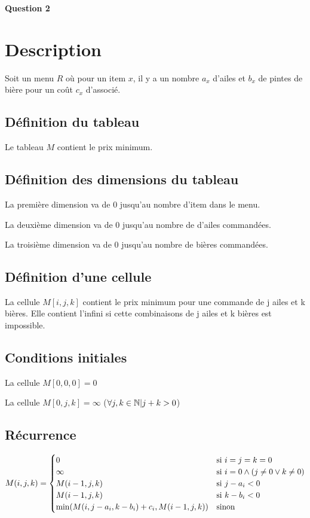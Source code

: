 \documentclass[class=article]{standalone}
\begin{document}
\centerline{\Huge \bf Question 2}
\bigskip

\section*{Description}

Soit un menu $R$ où pour un item $x$, il y a un nombre $a_x$ d'ailes 
et $b_x$ de pintes de bière pour un coût $c_x$ d'associé.

\subsection*{Définition du tableau}

Le tableau $M$ contient le prix minimum.

\subsection*{Définition des dimensions du tableau}

La première dimension va de 0 jusqu'au nombre d'item dans le menu.

La deuxième dimension va de 0 jusqu'au nombre de d'ailes commandées.

La troisième dimension va de 0 jusqu'au nombre de bières commandées.

\subsection*{Définition d'une cellule}

La cellule $M[i,j,k]$ contient le prix minimum pour une commande de j ailes et k bières.
Elle contient l'infini si cette combinaisons de j ailes et k bières est impossible.


\subsection*{Conditions initiales}

La cellule $M[0, 0, 0] = 0$

La cellule $M[0, j, k] = \infty$ ($\forall j, k \in \mathbb{N} | j + k > 0$)

\subsection*{Récurrence}

\[
    M(i, j, k) =
    \begin{cases}
        0 & \text{si } i=j=k=0 \\
        \infty & \text{si } i=0\wedge \left ( j \neq 0 \vee k \neq 0 \right ) \\
        M(i-1, j, k) & \text{si } j-a_i < 0 \\
        M(i-1, j, k) & \text{si } k-b_i < 0 \\
        \min(M(i, j-a_i, k-b_i) + c_i, M(i-1, j, k)) & \text{sinon }
    \end{cases}
\]
\end{document}
